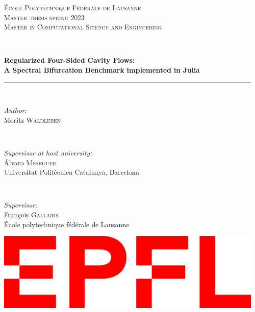 \begin{titlepage}
\newcommand{\HRule}{\rule{\linewidth}{0.5mm}}

\center
 

\vspace{3cm}
\textsc{\LARGE École Polytechnique Fédérale de Lausanne}\\[1.5cm]
\textsc{\Large Master thesis spring 2023}\\[0.5cm]
\textsc{\large Master in Computational Science and Engineering}\\[0.5cm]


\HRule \\[0.4cm]
{ \huge \bfseries  Regularized Four-Sided Cavity Flows:\\ A Spectral
  Bifurcation Benchmark implemented in Julia}\\[0.4cm]
\HRule \\[1.5cm]
 

\begin{flushleft} \large
\emph{Author:} \\
Moritz \textsc{Waldleben}
\end{flushleft}
~
\begin{flushleft} \large
\emph{Supervisor at host university:} \\
Álvaro \textsc{Meseguer} \\
Universitat Politècnica Catalunya, Barcelona
\end{flushleft}
~
\begin{flushleft} \large
\emph{Supervisor:} \\ 
François \textsc{Gallaire} \\
École polytechnique fédérale de Lausanne
\end{flushleft}

\vspace{7cm}


\begin{center}
\includegraphics[width=0.3\linewidth]{figs/logo_epfl}\\[1cm]
\end{center}
 

\vfill

\end{titlepage}
